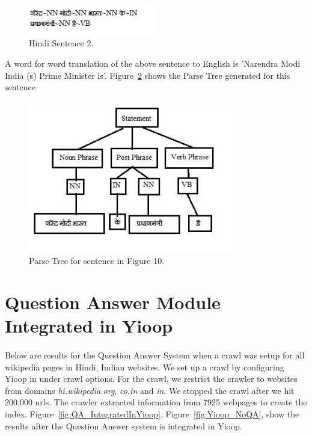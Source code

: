 \begin{figure}[htb]
\centering
\includegraphics[width=0.5\textwidth]{images/sentence_testcase2.jpg}
\caption{Hindi Sentence 2.} 
\label{fig:sentence_testcase2}
\end{figure}

A word for word translation of the above sentence to English is 'Narendra Modi India (s) Prime Minister is'. Figure~\ref{fig:standalone_testcase2} shows the Parse Tree generated for this sentence 

\begin{figure}[htb]
\centering
\includegraphics[width=0.8\textwidth]{images/standalone_testcase2.jpg}
\caption{Parse Tree for sentence in Figure 10.} 
\label{fig:standalone_testcase2}
\end{figure}

\break
\section{Question Answer Module Integrated in Yioop}
\paragraph{}
Below are results for the Question Answer System when a crawl was setup for all wikipedia pages in Hindi, Indian websites. We set up a crawl by configuring Yioop in under crawl options. For the crawl, we restrict the crawler to websites from domains \textit{hi.wikipedia.org}, \textit{co.in} and \textit{in}. We stopped the crawl  after we hit 200,000 urls. The crawler extracted information from 7925 webpages to create the index. Figure~\ref{fig:QA_IntegratedInYioop},  Figure~\ref{fig:Yioop_NoQA}, show the results after the Question Answer system is integrated in Yioop. 

